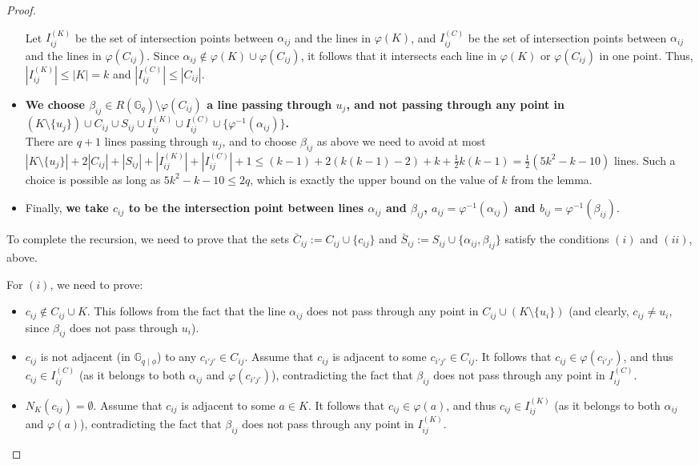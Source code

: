 \documentclass[10pt,a4paper]{article}
\newcommand{\ls}{\leqslant}
\newcommand{\G}[1][q]{\mathbb{G}_{#1}}
\newcommand{\Gphi}[1][q]{\mathbb{G}_{#1\mid\phi}}
\begin{document}
\begin{proof}
\begin{itemize}
        Let $I_{ij}^{(K)}$ be the set of intersection points between $\alpha_{ij}$ and the lines in $\varphi(K)$, and $I_{ij}^{(C)}$ be the set of intersection points between $\alpha_{ij}$ and the lines in $\varphi(C_{ij})$. Since $\alpha_{ij} \not\in \varphi(K) \cup \varphi(C_{ij})$, it follows that it intersects each line in $\varphi(K)$ or $\varphi(C_{ij})$ in one point. Thus, $|I_{ij}^{(K)}| \ls |K| = k$ and $|I_{ij}^{(C)}| \ls |C_{ij}|$.

        \item \textbf{We choose $\beta_{ij}\in R(\G) \setminus \varphi(C_{ij})$ a line passing through $u_j$, and not passing through any point in $(K \setminus \{u_j\}) \cup C_{ij} \cup S_{ij} \cup I_{ij}^{(K)} \cup I_{ij}^{(C)} \cup \{ \varphi^{-1}(\alpha_{ij}) \}$.} \\
        There are $q+1$ lines passing through $u_j$, and to choose $\beta_{ij}$ as above we need to avoid at most  $|K \setminus \{u_j\}| + 2|C_{ij}| + |S_{ij}| + |I_{ij}^{(K)}| + |I_{ij}^{(C)}| + 1 \ls (k-1) + 2(k(k-1)-2) + k + \frac{1}{2}k(k-1) = \frac{1}{2}(5k^2 -k -10)$ lines.  Such a choice is possible as long as  $5k^2 -k -10 \ls 2q$, which is exactly the upper bound on the value of $k$ from the lemma.

        \item Finally, \textbf{we take $c_{ij}$ to be the intersection point between lines $\alpha_{ij}$ and $\beta_{ij}$, $a_{ij} = \varphi^{-1}(\alpha_{ij})$ and $b_{ij} = \varphi^{-1}(\beta_{ij})$}.
    \end{itemize}

     To complete the recursion, we need to prove that the sets $\bar{C}_{ij} := C_{ij} \cup\{c_{ij}\}$ and $\bar{S}_{ij} := S_{ij} \cup\{\alpha_{ij}, \beta_{ij}\}$ satisfy the conditions  $(i)$ and  $(ii)$, above.

    \smallskip \noindent For $(i)$, we need to prove:
    \begin{itemize}%
        \item $c_{ij} \not\in C_{ij}\cup K$. This follows from the fact that the line $\alpha_{ij}$ does not pass through any point in $ C_{ij}\cup (K \setminus \{u_i\})$ (and clearly, $c_{ij} \neq u_i$, since $\beta_{ij}$ does not pass through $u_i$).
        \item $c_{ij} $ is not adjacent (in $\Gphi$) to any $c_{i'j'}\in C_{ij}$. Assume that $c_{ij} $ is  adjacent to some $c_{i'j'}\in C_{ij}$. It follows that $c_{ij} \in  \varphi(c_{i'j'})$, and thus $c_{ij}\in I_{ij}^{(C)}$ (as it belongs to both $\alpha_{ij}$ and $\varphi(c_{i'j'})$), contradicting the fact that $\beta_{ij}$ does not pass through any point in $I_{ij}^{(C)}$.
        \item $N_K(c_{ij})  = \emptyset$. Assume that $c_{ij} $ is  adjacent to some $a \in K$. It follows that $c_{ij} \in  \varphi(a)$, and thus $c_{ij}\in I_{ij}^{(K)}$ (as it belongs to both $\alpha_{ij}$ and $\varphi(a)$), contradicting the fact that $\beta_{ij}$ does not pass through any point in $I_{ij}^{(K)}$.
    \end{itemize}


\end{proof}
\end{document}
